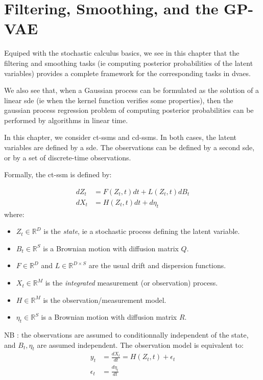 \chapter{Filtering, Smoothing, and the GP-VAE}\label{sec:filter smoother gps}

Equiped with the stochastic calculus basics, we see in this chapter that the filtering and smoothing 
tasks (ie computing posterior probabilities of the latent variables) provides a complete framework 
for the corresponding tasks in \glspl{dvae}.

We also see that, when a Gaussian process can be formulated as the solution of a linear \gls{sde} (ie
 when the kernel function verifies some properties), then the gaussian process regression problem 
 of computing posterior probabilities can be performed by algorithms in linear time.

In this chapter, we consider \glspl{ct-ssm} and \glspl{cd-ssm}. In both cases, the latent variables are 
defined by a \gls{sde}. The observations can be defined by a second \gls{sde}, or by a set of 
discrete-time observations.

Formally, the \gls{ct-ssm} is defined by:

\begin{tcolorbox}[colback=blue!5!white,colframe=black!75!black,title=Continuous-Time State Space model]
    \begin{align}
        dZ_t &= F(Z_t, t)dt + L(Z_t,t) dB_t \\
        dX_t &= H(Z_t,t)dt + d\eta_t
    \end{align}
    where:
    \begin{itemize}
        \item $Z_t \in \mathbb{R}^{D}$ is the \textit{state}, ie a stochastic process defining the latent variable.
        \item $B_t \in \mathbb{R}^{S}$ is a Brownian motion with diffusion matrix $Q$.
        \item $F \in \mathbb{R}^{D}$ and $L \in \mathbb{R}^{D \times S}$ are the usual drift and dispersion functions.
        \item $X_t \in \mathbb{R}^{M}$ is the \textit{integrated} measurement (or observation) process.
        \item $H \in \mathbb{R}^{M}$ is the observation/measurement model.
        \item $\eta_t \in \mathbb{R}^{S}$ is a Brownian motion with diffusion matrix $R$.
    \end{itemize}
    NB : the observations are assumed to conditionnally independent of the state, and $B_t, \eta_t$ are 
     assumed independent.
    The observation model is equivalent to:
    \begin{align}
        y_t &= \frac{dX_t}{dt} = H(Z_t,t) + \epsilon_t \\
        \epsilon_t &= \frac{d \eta_t}{dt}
    \end{align}
\end{tcolorbox}

